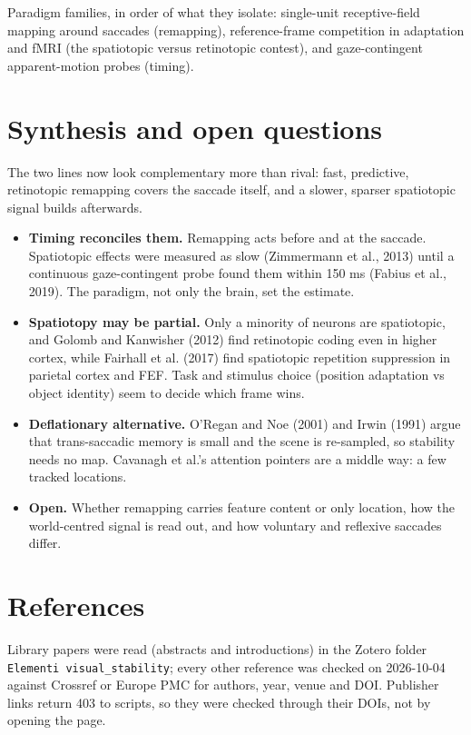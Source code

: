 \documentclass[11pt,a4paper]{article}
\begin{document}
Paradigm families, in order of what they isolate: single-unit receptive-field mapping around saccades (remapping), reference-frame competition in adaptation and fMRI (the spatiotopic versus retinotopic contest), and gaze-contingent apparent-motion probes (timing).

\section{Synthesis and open questions}

The two lines now look complementary more than rival: fast, predictive, retinotopic remapping covers the saccade itself, and a slower, sparser spatiotopic signal builds afterwards.

\begin{itemize}[itemsep=2pt,topsep=2pt]
\item \textbf{Timing reconciles them.} Remapping acts before and at the saccade. Spatiotopic effects were measured as slow (Zimmermann et al., 2013) until a continuous gaze-contingent probe found them within 150 ms (Fabius et al., 2019). The paradigm, not only the brain, set the estimate.
\item \textbf{Spatiotopy may be partial.} Only a minority of neurons are spatiotopic, and Golomb and Kanwisher (2012) find retinotopic coding even in higher cortex, while Fairhall et al. (2017) find spatiotopic repetition suppression in parietal cortex and FEF. Task and stimulus choice (position adaptation vs object identity) seem to decide which frame wins.
\item \textbf{Deflationary alternative.} O'Regan and Noe (2001) and Irwin (1991) argue that trans-saccadic memory is small and the scene is re-sampled, so stability needs no map. Cavanagh et al.'s attention pointers are a middle way: a few tracked locations.
\item \textbf{Open.} Whether remapping carries feature content or only location, how the world-centred signal is read out, and how voluntary and reflexive saccades differ.
\end{itemize}

\section*{References}

Library papers were read (abstracts and introductions) in the Zotero folder \texttt{Elementi visual\_stability}; every other reference was checked on 2026-10-04 against Crossref or Europe PMC for authors, year, venue and DOI. Publisher links return 403 to scripts, so they were checked through their DOIs, not by opening the page.
\end{document}
